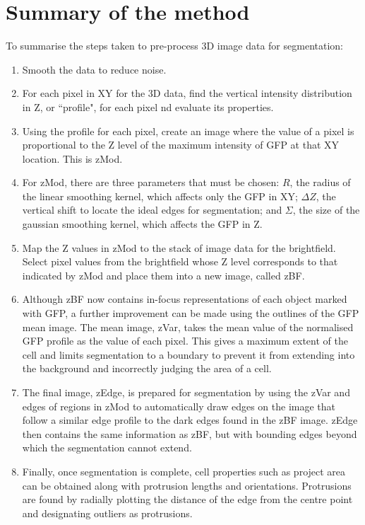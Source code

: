 \section{Summary of the method}

To summarise the steps taken to pre-process 3D image data for segmentation:
\begin{enumerate}
\item Smooth the data to reduce noise.
\item For each pixel in XY for the 3D data, find the vertical intensity distribution in Z, or ``profile", for each pixel nd evaluate its properties.
\item Using the profile for each pixel, create an image where the value of a pixel is proportional to the Z level of the maximum intensity of GFP at that XY location. This is zMod.
\item For zMod, there are three parameters that must be chosen: $R$, the radius of the linear smoothing kernel, which affects only the GFP in XY; $\Delta Z$, the vertical shift to locate the ideal edges for segmentation; and $\Sigma$, the size of the gaussian smoothing kernel, which affects the GFP in Z.
\item Map the Z values in zMod to the stack of image data for the brightfield. Select pixel values from the brightfield whose Z level corresponds to that indicated by zMod and place them into a new image, called zBF.
\item Although zBF now contains in-focus representations of each object marked with GFP, a further improvement can be made using the outlines of the GFP mean image. The mean image, zVar, takes the mean value of the normalised GFP profile as the value of each pixel. This gives a maximum extent of the cell and limits segmentation to a boundary to prevent it from extending into the background and incorrectly judging the area of a cell.
\item The final image, zEdge, is prepared for segmentation by using the zVar and edges of regions in zMod to automatically draw edges on the image that follow a similar edge profile to the dark edges found in the zBF image. zEdge then contains the same information as zBF, but with bounding edges beyond which the segmentation cannot extend.
\item Finally, once segmentation is complete, cell properties such as project area can be obtained along with protrusion lengths and orientations. Protrusions are found by radially plotting the distance of the edge from the centre point and designating outliers as protrusions.
\end{enumerate}

